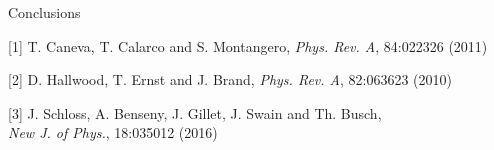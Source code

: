 \documentclass[final]{beamer}
\begin{document}
\begin{frame}
\begin{columns}[t]
\begin{column}{.49\textwidth}
\begin{block}{Conclusions}
  \hrulefill

  [1] T. Caneva, T. Calarco and S. Montangero, \textit{Phys. Rev. A}, 84:022326 \hspace*{3ex}(2011)

  [2] D. Hallwood, T. Ernst and J. Brand, \textit{Phys. Rev. A}, 82:063623 (2010)

  [3] J. Schloss, A. Benseny, J. Gillet, J. Swain and Th. Busch, \\ \hspace*{3ex}\textit{New J. of Phys.}, 18:035012 (2016)

\end{block}
\end{column}
\end{columns}
\end{frame}
\end{document}
